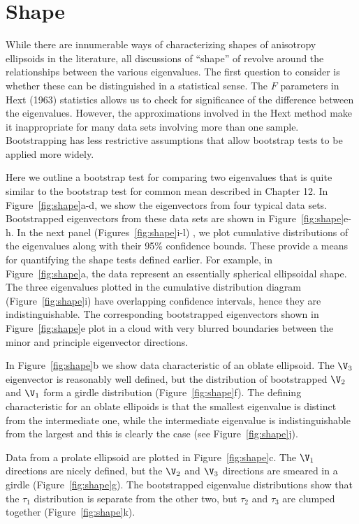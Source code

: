 \section {Shape}


While there  are innumerable ways of  characterizing shapes of anisotropy
ellipsoids in the literature, all discussions of ``shape'' of revolve
around the relationships between the various eigenvalues. 
The first
question to consider is whether these can be distinguished in a
statistical sense. 
The $F$ parameters in Hext (1963)  statistics allows us 
 to check for significance of the difference between the eigenvalues. However, the approximations involved in the
Hext method make it inappropriate for many data sets involving more than one
sample.  Bootstrapping has  less restrictive
assumptions that allow bootstrap tests to be applied more widely.

Here we outline a 
 bootstrap test for comparing two eigenvalues that is  quite similar to the bootstrap test for
common mean described in Chapter 12. In Figure~\ref{fig:shape}a-d, we
show the eigenvectors from four typical data sets.    Bootstrapped eigenvectors from these data sets   are shown in Figure~\ref{fig:shape}e-h.   In the next panel (Figures~\ref{fig:shape}i-l) , we plot cumulative distributions of the eigenvalues  along with their 95\% confidence bounds.  
   These provide a means for quantifying the shape tests defined
earlier.   For example, in 
 Figure~\ref{fig:shape}a,  the data represent an essentially spherical ellipsoidal shape. The  three
eigenvalues plotted in the cumulative distribution diagram (Figure~\ref{fig:shape}i)
have overlapping confidence intervals, hence they are
indistinguishable.  The corresponding bootstrapped eigenvectors shown 
in Figure~\ref{fig:shape}e plot in a cloud with very blurred boundaries between the minor and principle eigenvector directions.  

In Figure~\ref{fig:shape}b we show data characteristic of an oblate
ellipsoid.   The
$\V_3$ eigenvector is reasonably well defined, but 
the distribution of bootstrapped $\V_2$ and $\V_1$ form a girdle 
distribution (Figure~\ref{fig:shape}f).   The defining characteristic for an oblate ellipoids is that the smallest  eigenvalue is distinct from the intermediate one, while the intermediate eigenvalue is indistinguishable from the largest and this is clearly the case (see Figure~\ref{fig:shape}j).    

Data from a prolate ellipsoid are plotted in Figure~\ref{fig:shape}c.  The $\V_1$ directions are nicely defined, but the 
$\V_2$ and $\V_3$ directions are smeared in a girdle
(Figure~\ref{fig:shape}g).    The bootstrapped eigenvalue distributions  show that the 
 $\tau_1$ distribution is separate from the other two, but   $\tau_2$ and $\tau_3$ are clumped together  
(Figure~\ref{fig:shape}k).  


